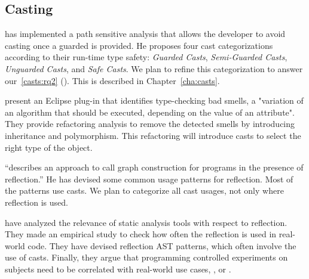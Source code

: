\subsection*{Casting}
\label{sec:lr:casting}


\cite{wintherGuardedTypePromotion2011} has implemented a
path sensitive analysis that allows the developer to avoid casting
once a guarded  is provided.
He proposes four cast categorizations according to their
run-time type safety:
\emph{Guarded Casts}, \emph{Semi-Guarded Casts},
\emph{Unguarded Casts}, and \emph{Safe Casts}.
We plan to refine this categorization to answer
our~\ref{casts:rq2} (\emph{\crqB}).
This is described in Chapter~\ref{cha:casts}.

\cite{tsantalisJDeodorantIdentificationRemoval2008} present an
Eclipse plug-in that identifies type-checking bad smells,
a "variation of an algorithm that should be executed,
depending on the value of an attribute".
They provide refactoring analysis to remove the detected smells
by introducing inheritance and polymorphism.
This refactoring will introduce casts to select
the right type of the object.

\cite{livshitsImprovingSoftwareSecurity2006,livshitsReflectionAnalysisJava2005} ``describes an approach to call graph construction for \java{} programs in the presence of reflection.''
He has devised some common usage patterns for reflection.
Most of the patterns use casts.
We plan to categorize all cast usages, not only where reflection is used.

\cite{landmanChallengesStaticAnalysis2017} have analyzed the relevance of static analysis tools with respect to reflection.
They made an empirical study to check how often the reflection \api{} is used in real-world code.
They have devised reflection AST patterns, which often involve the use of casts.
Finally, they argue that programming controlled experiments on subjects need to be correlated with real-world use cases, \eg{}, \github{} or \mavencentral{}.

